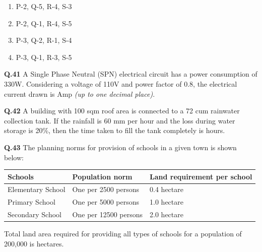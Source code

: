 \documentclass{article}
\begin{document}
\begin{multicols}{2}
\begin{enumerate}[label=(\Alph*)]
\item P-2, Q-5, R-4, S-3
\item P-2, Q-1, R-4, S-5
\item P-3, Q-2, R-1, S-4
\item P-3, Q-1, R-3, S-5
\end{enumerate}
\end{multicols}

\vspace{1cm}

\noindent
\textbf{Q.41} \hspace{0.15cm}  A Single Phase Neutral (SPN) electrical circuit has a power consumption of 330W. Considering a voltage of 110V and power factor of 0.8, the electrical current drawn is \underline{\hspace{3cm}} Amp \emph{(up to one decimal place)}.

\vspace{1cm}

\noindent
\textbf{Q.42}\hspace{0.15cm} A building with 100 sqm roof area is connected to a 72 cum rainwater collection tank. If the rainfall is 60 mm per hour and the loss during water storage is 20\%, then the time taken to fill the tank completely is \underline{\hspace{3cm}} hours.

\vspace{1cm}

\noindent
\textbf{Q.43}\hspace{0.15cm} The planning norms for provision of schools in a given town is shown below:

\begin{table}[h!]
\centering
\begin{tabular}{|l|l|l|}
\hline
\textbf{Schools} & \textbf{Population norm} & \textbf{Land requirement per school} \\
\hline
Elementary School & One per 2500 persons & 0.4 hectare \\
Primary School    & One per 5000 persons & 1.0 hectare \\
Secondary School  & One per 12500 persons & 2.0 hectare \\
\hline
\end{tabular}
\end{table}

\noindent \hspace{1cm}\parbox[t]{13cm}{
Total land area required for providing all types of schools for a population of 200,000 is \underline{\hspace{3cm}} hectares.}
\end{document}
